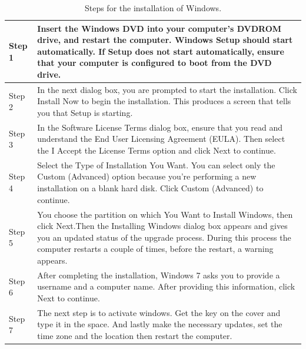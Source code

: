 \begin{table}
\centering
\begin{tabular}{|l|p{4.5in}|} %
\hline
Step 1 & Insert the Windows DVD into your computer's DVD­ROM drive, and restart the computer. Windows  Setup should start automatically. If Setup does not start automatically, ensure that your computer is configured to boot from the DVD drive. \\
\hline
Step 2 & In the next dialog box, you are prompted to start the installation. Click Install Now to begin the installation. This produces a screen that tells you that Setup is starting.  \\
\hline
Step 3 & In the Software License Terms dialog box, ensure that you read and understand the End User Licensing Agreement (EULA). Then select the I Accept the License Terms option and click Next to continue. \\
\hline
Step 4  & Select the Type of Installation You Want. You can select only the Custom (Advanced) option because you're performing a new installation on a blank hard disk. Click Custom (Advanced) to continue. \\
\hline
Step 5 & You choose the partition on which You Want to Install Windows, then click Next.Then the Installing Windows dialog box appears and gives you an updated status of the upgrade process. During this process the computer restarts a couple of times, before the restart, a warning appears.  \\
\hline
Step 6 & After completing the installation, Windows 7 asks you to provide a username and a computer name. After providing this information, click Next to continue.\\
\hline
Step 7 & The next step is to activate windows. Get the key on the cover and type it in the space. 
And lastly make the necessary updates, set the time zone and the location then restart the computer. \\

\hline
\end{tabular}
\caption{Steps for the installation of Windows.}
\end{table}

